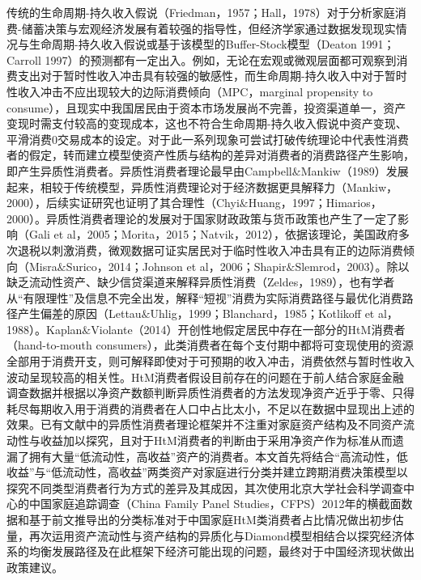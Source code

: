 \documentclass[supercite]{HustGraduPaper}
\begin{document}
    传统的生命周期-持久收入假说（Friedman，1957；Hall，1978）对于分析家庭消费-储蓄决策与宏观经济发展有着较强的指导性，但经济学家通过数据发现现实情况与生命周期-持久收入假说或基于该模型的Buffer-Stock模型（Deaton 1991；Carroll 1997）的预测都有一定出入。例如，无论在宏观或微观层面都可观察到消费支出对于暂时性收入冲击具有较强的敏感性，而生命周期-持久收入中对于暂时性收入冲击不应出现较大的边际消费倾向（MPC，marginal propensity to consume），且现实中我国居民由于资本市场发展尚不完善，投资渠道单一，资产变现时需支付较高的变现成本，这也不符合生命周期-持久收入假说中资产变现、平滑消费0交易成本的设定。对于此一系列现象可尝试打破传统理论中代表性消费者的假定，转而建立模型使资产性质与结构的差异对消费者的消费路径产生影响，即产生异质性消费者。异质性消费者理论最早由Campbell$\&$Mankiw（1989）发展起来，相较于传统模型，异质性消费理论对于经济数据更具解释力（Mankiw，2000），后续实证研究也证明了其合理性（Chyi$\&$Huang，1997；Himarios，2000）。异质性消费者理论的发展对于国家财政政策与货币政策也产生了一定了影响（Gali et al，2005；Morita，2015；Natvik，2012），依据该理论，美国政府多次退税以刺激消费，微观数据可证实居民对于临时性收入冲击具有正的边际消费倾向（Misra$\&$Surico，2014；Johnson et al，2006；Shapir$\&$Slemrod，2003）。除以缺乏流动性资产、缺少信贷渠道来解释异质性消费（Zeldes，1989），也有学者从“有限理性”及信息不完全出发，解释“短视”消费为实际消费路径与最优化消费路径产生偏差的原因（Lettau$\&$Uhlig，1999；Blanchard，1985；Kotlikoff et al，1988）。Kaplan$\&$Violante（2014）开创性地假定居民中存在一部分的HtM消费者（hand-to-mouth consumers），此类消费者在每个支付期中都将可变现使用的资源全部用于消费开支，则可解释即使对于可预期的收入冲击，消费依然与暂时性收入波动呈现较高的相关性。HtM消费者假设目前存在的问题在于前人结合家庭金融调查数据并根据以净资产数额判断异质性消费者的方法发现净资产近乎于零、只得耗尽每期收入用于消费的消费者在人口中占比太小，不足以在数据中显现出上述的效果。已有文献中的异质性消费者理论框架并不注重对家庭资产结构及不同资产流动性与收益加以探究，且对于HtM消费者的判断由于采用净资产作为标准从而遗漏了拥有大量“低流动性，高收益”资产的消费者。本文首先将结合“高流动性，低收益”与“低流动性，高收益”两类资产对家庭进行分类并建立跨期消费决策模型以探究不同类型消费者行为方式的差异及其成因，其次使用北京大学社会科学调查中心的中国家庭追踪调查（China Family Panel Studies，CFPS）2012年的横截面数据和基于前文推导出的分类标准对于中国家庭HtM类消费者占比情况做出初步估量，再次运用资产流动性与资产结构的异质化与Diamond模型相结合以探究经济体系的均衡发展路径及在此框架下经济可能出现的问题，最终对于中国经济现状做出政策建议。
\end{document}
